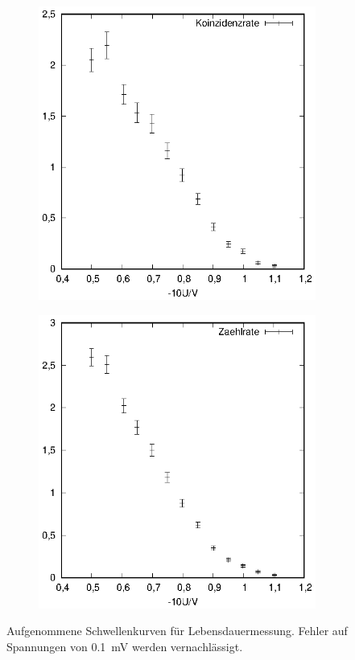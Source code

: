 \begin{figure}[h]
\begin{subfigure}[h]{0.5\textwidth}
  \end{subfigure}
  \begin{subfigure}[h]{0.5\textwidth}
    \centering
    \includegraphics[width=\textwidth]{data/schwelle_2_koinzidenz.eps}
  \end{subfigure}%
  \begin{subfigure}[h]{0.5\textwidth}
    \centering
    \includegraphics[width=\textwidth]{data/schwelle_2_zaehler.eps}
  \end{subfigure}
  \caption{Aufgenommene Schwellenkurven für Lebensdauermessung. Fehler auf Spannungen von \SI{0.1}{\milli\volt} werden vernachlässigt.}
  \label{fig:schwelle_lebensdauer}
\end{figure} 
